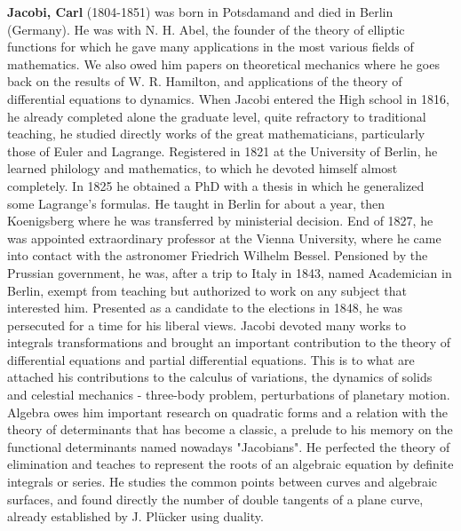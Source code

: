 \textbf{Jacobi, Carl} (1804-1851) was born in Potsdamand and died in Berlin (Germany). He was with N. H. Abel, the founder of the theory of elliptic functions for which he gave many applications in the most various fields of mathematics. We also owed him papers on theoretical mechanics where he goes back on the results of W. R. Hamilton, and applications of the theory of differential equations to dynamics. When Jacobi entered the High school in 1816, he already completed alone the graduate level, quite refractory to traditional teaching, he studied directly works of the great mathematicians, particularly those of Euler and Lagrange. Registered in 1821 at the University of Berlin, he learned philology and mathematics, to which he devoted himself almost completely. In 1825 he obtained a PhD with a thesis in which he generalized some Lagrange's formulas. He taught in Berlin for about a year, then Koenigsberg where he was transferred by ministerial decision. End of 1827, he was appointed extraordinary professor at the Vienna University, where he came into contact with the astronomer Friedrich Wilhelm Bessel. Pensioned by the Prussian government, he was, after a trip to Italy in 1843, named Academician in Berlin, exempt from teaching but authorized to work on any subject that interested him. Presented as a candidate to the elections in 1848, he was persecuted for a time for his liberal views. Jacobi devoted many works to integrals transformations and brought an important contribution to the theory of differential equations and partial differential equations. This is to what are attached his contributions to the calculus of variations, the dynamics of solids and celestial mechanics - three-body problem, perturbations of planetary motion. Algebra owes him important research on quadratic forms and a relation with the theory of determinants that has become a classic, a prelude to his memory on the functional determinants named nowadays "Jacobians". He perfected the theory of elimination and teaches to represent the roots of an algebraic equation by definite integrals or series. He studies the common points between curves and algebraic surfaces, and found directly the number of double tangents of a plane curve, already established by J. Plücker using duality.

